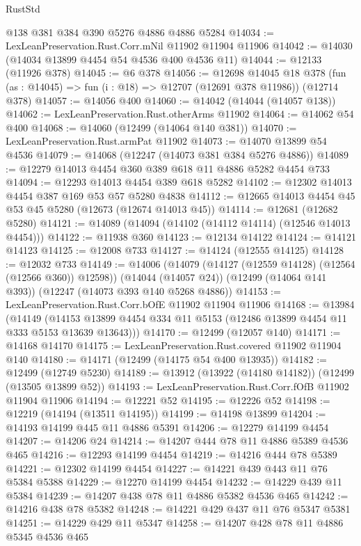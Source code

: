 \begin{lexlean}{RustStd}
\begin{coremodule}
{\begin{coremodule}
{{{{{{{{{{{{{{{{{{{{{{{{{{{{{{{{{{{{{{{{{{{{{{{{{{{{{{{{{{{{{{{{{{{{{{{{{{{{{{{{    @138
    @381
    @384
    @390
    @5276
    @4886
    @4886
    @5284
@14034 := LexLeanPreservation.Rust.Corr.mNil @11902 @11904 @11906
@14042 := @14030 (@14034 @13899 @4454 @54 @4536 @400 @4536 @11)
@14044 := @12133 (@11926 @378)
@14045 := @6 @378
@14056 := @12698
    @14045
    @18
    @378
    (fun (as : @14045) => fun (i : @18) => @12707 (@12691 @378 @11986))
    (@12714 @378)
@14057 := @14056 @400
@14060 := @14042 (@14044 (@14057 @138))
@14062 := LexLeanPreservation.Rust.otherArms @11902
@14064 := @14062 @54 @400
@14068 := @14060 (@12499 (@14064 @140 @381))
@14070 := LexLeanPreservation.Rust.armPat @11902
@14073 := @14070 @13899 @54 @4536
@14079 := @14068 (@12247 (@14073 @381 @384 @5276 @4886))
@14089 := @12279 @14013 @4454 @360 @389 @618 @11 @4886 @5282 @4454 @733
@14094 := @12293 @14013 @4454 @389 @618 @5282
@14102 := @12302 @14013 @4454 @387 @169 @53 @57 @5280 @4838
@14112 := @12665 @14013 @4454 @45 @53 @45 @5280 (@12673 (@12674 @14013 @45))
@14114 := @12681 (@12682 @5280)
@14121 := @14089 (@14094 (@14102 (@14112 @14114) (@12546 @14013 @4454)))
@14122 := @11938 @360
@14123 := @12134 @14122
@14124 := @14121 @14123
@14125 := @12008 @733
@14127 := @14124 (@12555 @14125)
@14128 := @12032 @733
@14149 := @14006
    (@14079 (@14127 (@12559 @14128) (@12564 (@12566 @360)) @12598))
    (@14044 (@14057 @24))
    (@12499 (@14064 @141 @393))
    (@12247 (@14073 @393 @140 @5268 @4886))
@14153 := LexLeanPreservation.Rust.Corr.bOfE @11902 @11904 @11906
@14168 := @13984
    (@14149 (@14153 @13899 @4454 @334 @11 @5153 (@12486 @13899 @4454 @11 @333 @5153 @13639 @13643)))
@14170 := @12499 (@12057 @140)
@14171 := @14168 @14170
@14175 := LexLeanPreservation.Rust.covered @11902 @11904 @140
@14180 := @14171 (@12499 (@14175 @54 @400 @13935))
@14182 := @12499 (@12749 @5230)
@14189 := @13912 (@13922 (@14180 @14182)) (@12499 (@13505 @13899 @52))
@14193 := LexLeanPreservation.Rust.Corr.fOfB @11902 @11904 @11906
@14194 := @12221 @52
@14195 := @12226 @52
@14198 := @12219 (@14194 (@13511 @14195))
@14199 := @14198 @13899
@14204 := @14193 @14199 @445 @11 @4886 @5391
@14206 := @12279 @14199 @4454
@14207 := @14206 @24
@14214 := @14207 @444 @78 @11 @4886 @5389 @4536 @465
@14216 := @12293 @14199 @4454
@14219 := @14216 @444 @78 @5389
@14221 := @12302 @14199 @4454
@14227 := @14221 @439 @443 @11 @76 @5384 @5388
@14229 := @12270 @14199 @4454
@14232 := @14229 @439 @11 @5384
@14239 := @14207 @438 @78 @11 @4886 @5382 @4536 @465
@14242 := @14216 @438 @78 @5382
@14248 := @14221 @429 @437 @11 @76 @5347 @5381
@14251 := @14229 @429 @11 @5347
@14258 := @14207 @428 @78 @11 @4886 @5345 @4536 @465
}}}}}}}}}}}}}}}}}}}}}}}}}}}}}}}}}}}}}}}}}}}}}}}}}}}}}}}}}}}}}}}}}}}}}}}}}}}}}}}}
\end{coremodule}}
\end{coremodule}
\end{lexlean}
